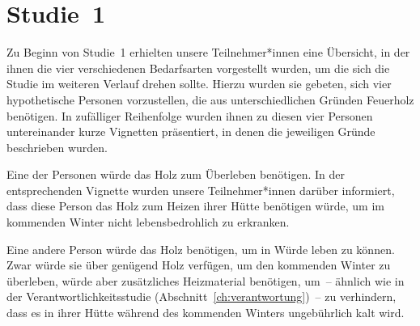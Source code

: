 \documentclass[justified,nobib,nohyper,symmetric,twoside]{tufte-book}
\begin{document}
\section{Studie~1}\label{sec:bedarfsarten_1}
Zu Beginn von Studie~1 erhielten unsere Teilnehmer*innen eine Übersicht, in der ihnen die vier verschiedenen Bedarfsarten vorgestellt wurden, um die sich die Studie im weiteren Verlauf drehen sollte.
Hierzu wurden sie gebeten, sich vier hypothetische Personen vorzustellen, die aus unterschiedlichen Gründen Feuerholz benötigen.
In zufälliger Reihenfolge wurden ihnen zu diesen vier Personen untereinander \mbox{kurze} Vignetten präsentiert, in denen die jeweiligen Gründe beschrieben wurden.

Eine der Personen würde das Holz zum Überleben benötigen.
In der entsprechenden Vignette wurden unsere Teilnehmer*innen darüber informiert, dass diese Person das Holz zum Heizen ihrer Hütte benötigen würde, um im kommenden Winter nicht lebensbedrohlich zu erkranken.

Eine andere Person würde das Holz benötigen, um in Würde leben zu können.
Zwar würde sie über genügend Holz verfügen, um den kommenden Winter zu überleben, würde aber zusätzliches Heizmaterial benötigen, um~-- ähnlich wie in der Verantwortlichkeitsstudie (Abschnitt~\ref{ch:verantwortung})~-- zu verhindern, dass es in ihrer Hütte während des kommenden Winters ungebührlich kalt wird.
\end{document}
